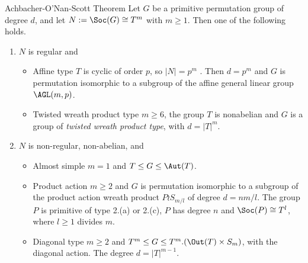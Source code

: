 \begin{frame}[fragile,label=OSTheorem]{Achbacher-O'Nan-Scott Theorem}
Let $G$ be a primitive permutation
group of degree $d$, and let $N := \Soc(G) \cong T^m$ with $m \geq 1$. 
Then one of the following holds.
\vskip2mm
\begin{enumerate}
\item 
$N$ is regular and
  \begin{itemize}
  \item 
  \alert{Affine type} $T$ is cyclic of order $p$, so $|N| = p^m$ . Then 
$d = p^m$ and $G$ is permutation isomorphic to a subgroup of the affine
general linear group $\AGL(m,p)$.
\vskip2mm
\item \alert{Twisted wreath product type} $m \geq 6$, the group $T$ is 
  nonabelian and $G$ is a group of \emph{twisted wreath product type}, with
  $d = |T|^m$.
  \end{itemize}
\vskip2mm
\item $N$ is non-regular, non-abelian, and
  \begin{itemize}
  \item 
\alert{Almost simple} $m = 1$ and $T \leq G \leq \Aut(T)$.
\vskip2mm
\item \alert{Product action} $m \geq 2$ and $G$ is permutation isomorphic to a
subgroup of the product action wreath product $P \wr S_{m/l}$ of degree
$d = nm/l$. The group $P$ is primitive of type 2.(a) or 2.(c), $P$ has
degree $n$ and $\Soc(P) \cong T^l$, where $l \geq 1$ divides $m$.
\vskip2mm
\item 
\alert{Diagonal type} $m \geq 2$ and $T^m \leq G \leq T^m . (\Out(T ) \times S_m)$, with
the diagonal action. The degree $d = |T|^{m-1}$.
  \end{itemize}
\end{enumerate}
\end{frame}

